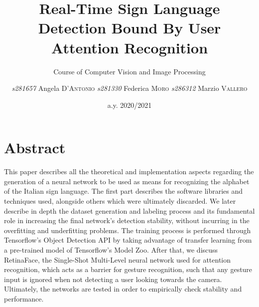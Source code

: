 \documentclass[a4paper, 12pt]{article}
\institute{Polytechnic of Turin}
\title{Real-Time Sign Language Detection Bound By User Attention Recognition }
\subtitle{Course of Computer Vision and Image Processing}
\author{\textit{s281657} Angela \textsc{D'Antonio}
        \textit{s281330} Federica \textsc{Moro}
        \textit{s286312} Marzio \textsc{Vallero}}
\date{a.y. 2020/2021}
\begin{document}
\maketitle
\romantableofcontents
\sloppy
\twocolumn

\section{Abstract}
\label{Abstract}
This paper describes all the theoretical and implementation aspects regarding the generation of a neural network to be used as means for recognizing the alphabet of the Italian sign language.
The first part describes the software libraries and techniques used, alongside others which were ultimately discarded.
We later describe in depth the dataset generation and labeling process and its fundamental role in increasing the final network's detection stability, without incurring in the overfitting and underfitting problems.
The training process is performed through Tensorflow's Object Detection API by taking advantage of transfer learning from a pre-trained model of Tensorflow's Model Zoo.
After that, we discuss RetinaFace, the Single-Shot Multi-Level neural network used for attention recognition, which acts as a barrier for gesture recognition, such that any gesture input is ignored when not detecting a user looking towards the camera.
Ultimately, the networks are tested in order to empirically check stability and performance.
\end{document}
